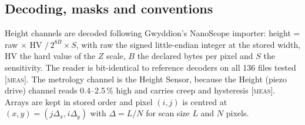 \documentclass[preprint,12pt]{elsarticle}
\newcommand{\tagm}{\textsc{[meas]}}
\begin{document}
\begin{table}[t]
\centering
\caption{Data folders. Probe: folder label and file-header values, which were not independently
checked. Frames: compared / catalogue files. Class: analysis driver.}
\label{tab:data}
\small
{}
\end{table}

\subsection{Decoding, masks and conventions}

Height channels are decoded following Gwyddion's NanoScope importer: height = raw $\times$ HV
$/\,2^{8B}\times S$, with raw the signed little-endian integer at the stored width, HV the hard
value of the $Z$ scale, $B$ the declared bytes per pixel and $S$ the sensitivity. The reader is
bit-identical to reference decoders on all 136 files tested \tagm. The metrology channel is the
Height Sensor, because the Height (piezo drive) channel reads 0.4--2.5\,\% high and carries creep
and hysteresis \tagm. Arrays are kept in stored order and pixel $(i,j)$ is centred at
$(x,y)=(j\Delta_x, i\Delta_y)$ with $\Delta = L/N$ for scan size $L$ and $N$ pixels.
\end{document}
